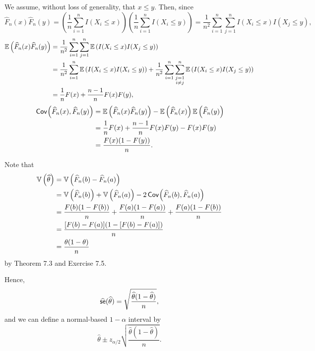 \begin{ex}
  We assume, without loss of generality, that $x\leq y$. Then, since
  \[
    \widehat{F}_n(x)\widehat{F}_n(y)
    =\left(\frac{1}{n}\sum_{i=1}^nI(X_i\leq x)\right)
    \left(\frac{1}{n}\sum_{i=1}^nI(X_i\leq y)\right)
    =\frac{1}{n^2}\sum_{i=1}^n\sum_{j=1}^nI(X_i\leq x)I(X_j\leq y),
  \]
  \begin{align*}
    \mathbb{E}\left(\widehat{F}_n(x)\widehat{F}_n(y)\right)
     & =\frac{1}{n^2}
    \sum_{i=1}^n\sum_{j=1}^n\mathbb{E}\left(I(X_i\leq x)I(X_j\leq y)\right)      \\
     & =\frac{1}{n^2}\sum_{i=1}^n\mathbb{E}\left(I(X_i\leq x)I(X_i\leq y)\right)
    +\frac{1}{n^2}\sum_{i=1}^n\sum_{\substack{j=1             \\ i\neq j}}^n\mathbb{E}\left(I(X_i\leq x)I(X_j\leq y)\right) \\
     & =\frac{1}{n}F(x)+\frac{n-1}{n}F(x)F(y),
  \end{align*}
  \begin{align*}
    \,\textsf{Cov}\mkern-2mu\left(\widehat{F}_n(x),\widehat{F}_n(y) \right)
     & =\mathbb{E}\left(\widehat{F}_n(x)\widehat{F}_n(y)\right)
    -\mathbb{E}\left(\widehat{F}_n(x)\right)\mathbb{E}\left(\widehat{F}_n(y)\right) \\
     & =\frac{1}{n}F(x)+\frac{n-1}{n}F(x)F(y)
    -F(x)F(y)                                 \\
     & =\frac{F(x)(1-F(y))}{n}.
  \end{align*}
\end{ex}

\begin{ex}
  Note that
  \begin{align*}
    \mathbb{V}\left(\widehat{\theta}\right)
     & =\mathbb{V}\left(\widehat{F}_n(b)-\widehat{F}_n(a)\right)                                                \\
     & =\mathbb{V}\left(\widehat{F}_n(b)\right)+\mathbb{V}\left(\widehat{F}_n(a)\right)-2\,\textsf{Cov}\mkern-2mu\left(\widehat{F}_n(b),\widehat{F}_n(a) \right) \\
     & =\frac{F(b)(1-F(b))}{n}
    +\frac{F(a)(1-F(a))}{n}
    +\frac{F(a)(1-F(b))}{n}                                                                    \\
     & =\frac{[F(b)-F(a)](1-[F(b)-F(a)])}{n}                                                   \\
     & =\frac{\theta(1-\theta)}{n}
  \end{align*}
  by Theorem 7.3 and Exercise 7.5.

  Hence,
  \[
    \widehat{\textsf{se}}(\widehat{\theta})
    =\sqrt{\frac{\widehat{\theta}(1-\widehat{\theta})}{n}},
  \]
  and we can define a normal-based $1-\alpha$ interval by
  \[
    \widehat{\theta}\pm z_{\alpha/2}
    \sqrt{\frac{\widehat{\theta}(1-\widehat{\theta})}{n}}.
  \]
\end{ex}

